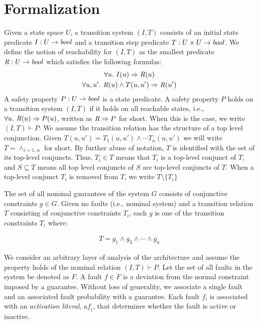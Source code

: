 \section{Formalization}
\label{sec:formalization}
Given a state space $U$, a transition system $(I,T)$ consists of an
initial state predicate $I : U \to \mathit{bool}$ and a transition step
predicate $T : U \times U \to \mathit{bool}$.
We define the notion of
reachability for $(I, T)$ as the smallest predicate $\mathit{R} : U \to
\mathit{bool}$ which satisfies the following formulas:
\begin{gather*}
  \forall u.~ I(u) \Rightarrow \mathit{R}(u) \\
  \forall u, u'.~ \mathit{R}(u) \land T(u, u') \Rightarrow \mathit{R}(u')
\end{gather*}
A safety property $P : U \to \mathit{bool}$ is a state predicate. A safety
property $P$ holds on a transition system $(I, T)$ if it holds on all
reachable states, i.e., $\forall u.~ \mathit{R}(u) \Rightarrow P(u)$,
written as $\mathit{R} \Rightarrow P$ for short. When this is the case, we
write $(I, T)\vdash P$. We assume the transition relation has the structure of a top level conjunction. Given $T(u, u') = T_1(u,u') \land \cdots T_n(u,u')$ we will write $T = \land_{i=1..n}$ for short. By further abuse of notation, $T$ is identified with the set of its top-level conjuncts. Thus, $T_i \in T$ means that $T_i$ is a top-level conjunct of $T$, and $S\subseteq T$ means all top level conjuncts of $S$ are top-level conjuncts of $T$. When a top-level conjunct $T_i$ is removed from $T$, we write $T \setminus \{T_i\}$

The set of all nominal guarantees of the system $G$ consists of conjunctive constraints $g \in G$. Given no faults (i.e., nominal system) and a transition relation $T$ consisting of conjunctive constraints $T_i$, each $g$ is one of the transition constraints $T_i$ where:

\begin{gather}
T = g_1 \land  g_2 \land \cdots \land g_n
\label{eq:Tn}
\end{gather}

We consider an arbitrary layer of analysis of the architecture and assume the property holds of the nominal relation $(I,T) \vdash P$. Let the set of all faults in the system be  denoted as $F$. A fault $f \in F$ is a deviation from the normal constraint imposed by a guarantee. Without loss of generality, we associate a single fault and an associated fault probability with a guarantee. Each fault $f_i$ is associated with an \emph{activation literal}, $\mathit{af}_i$, that determines whether the fault is active or inactive. %

